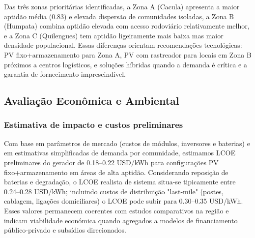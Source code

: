 \documentclass[12pt, a4paper]{article}
\begin{document}
Das três zonas prioritárias identificadas, a Zona A (Cacula) apresenta a maior aptidão média (0.83) e elevada dispersão de comunidades isoladas, a Zona B (Humpata) combina aptidão elevada com acesso rodoviário relativamente melhor, e a Zona C (Quilengues) tem aptidão ligeiramente mais baixa mas maior densidade populacional. Essas diferenças orientam recomendações tecnológicas: PV fixo+armazenamento para Zona A, PV com rastreador para locais em Zona B próximos a centros logísticos, e soluções híbridas quando a demanda é crítica e a garantia de fornecimento imprescindível.

\subsection{Avaliação Econômica e Ambiental}

\subsubsection{Estimativa de impacto e custos preliminares}

Com base em parâmetros de mercado (custos de módulos, inversores e baterias) e em estimativas simplificadas de demanda por comunidade, estimamos LCOE preliminares do gerador de 0.18–0.22 USD/kWh para configurações PV fixo+armazenamento em áreas de alta aptidão. Considerando reposição de baterias e degradação, o LCOE realista de sistema situa-se tipicamente entre 0.24–0.28 USD/kWh; incluindo custos de distribuição "last‑mile" (postes, cablagem, ligações domiciliares) o LCOE pode subir para 0.30–0.35 USD/kWh. Esses valores permanecem coerentes com estudos comparativos na região e indicam viabilidade económica quando agregados a modelos de financiamento público‑privado e subsídios direcionados.

\begin{center}
\end{center}
\end{document}

